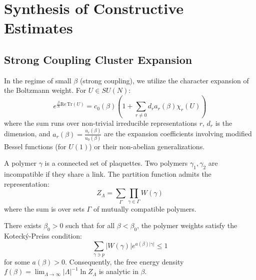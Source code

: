 
\section{Synthesis of Constructive Estimates}
\label{sec:technical_details_app145}

\subsection{Strong Coupling Cluster Expansion}
In the regime of small $\beta$ (strong coupling), we utilize the character expansion of the Boltzmann weight. For $U \in SU(N)$:
\begin{equation}
e^{\frac{\beta}{N} \mathrm{Re}\,\mathrm{Tr}(U)} = c_0(\beta) \left( 1 + \sum_{r \neq 0} d_r a_r(\beta) \chi_r(U) \right)
\end{equation}
where the sum runs over non-trivial irreducible representations $r$, $d_r$ is the dimension, and $a_r(\beta) = \frac{u_r(\beta)}{u_0(\beta)}$ are the expansion coefficients involving modified Bessel functions (for $U(1)$) or their non-abelian generalizations.

\begin{definition}
A polymer $\gamma$ is a connected set of plaquettes. Two polymers $\gamma_1, \gamma_2$ are incompatible if they share a link. The partition function admits the representation:
\begin{equation}
Z_\Lambda = \sum_{\Gamma} \prod_{\gamma \in \Gamma} W(\gamma)
\end{equation}
where the sum is over sets $\Gamma$ of mutually compatible polymers.
\end{definition}

\begin{theorem}
\label{thm:cluster_convergence_app145}
\label{thm:cluster-expansion}
There exists $\beta_0 > 0$ such that for all $\beta < \beta_0$, the polymer weights satisfy the Koteck\'y-Preiss condition:
\begin{equation}
\sum_{\gamma \ni p} |W(\gamma)| e^{a(\beta) |\gamma|} \le 1
\end{equation}
for some $a(\beta) > 0$. Consequently, the free energy density $f(\beta) = \lim_{\Lambda \to \infty} |\Lambda|^{-1} \ln Z_\Lambda$ is analytic in $\beta$.
\end{theorem}

